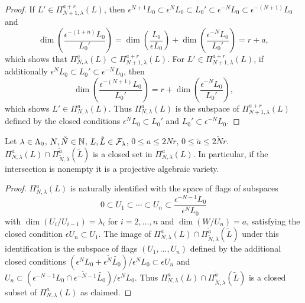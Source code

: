 \documentclass[a4paper, 11pt]{report}
\begin{document}
\begin{proof}
If $L'\in\Pi_{N+1,\lambda}^{a+r}(L)$, then $\epsilon^{N+1}L_0\subset \epsilon^N L_0\subset L_0'\subset\epsilon^{-N}L_0\subset\epsilon^{-(N+1)}L_0$ and
\begin{equation*}
\dim\left(\frac{\epsilon^{-(1+n)}L_0}{L_0'}\right) = \dim\left(\frac{L_0}{\epsilon L_0}\right) + \dim\left(\frac{\epsilon^{-N}L_0}{L_0'}\right) = r+a,
\end{equation*}
which shows that $\Pi_{N,\lambda}^a(L)\subset \Pi_{N+1,\lambda}^{a+r}(L)$. For $L'\in\Pi_{N+1,\lambda}^{a+r}(L)$, if additionally $\epsilon^N L_0\subset L_0'\subset\epsilon^{-N}L_0$, then
\begin{equation*}
\dim\left(\frac{\epsilon^{-(N+1)}L_0}{L_0'}\right) = r + \dim\left(\frac{\epsilon^{-N}L_0}{L_0'}\right),
\end{equation*}
which shows $L'\in\Pi_{N,\lambda}^a(L)$. Thus $\Pi_{N,\lambda}^a(L)$ is the subspace of $\Pi_{N+1,\lambda}^{a+r}(L)$ defined by the closed conditions $\epsilon^N L_0\subset L_0'$ and $L_0'\subset\epsilon^{-N}L_0$.
\end{proof}

\begin{lemma}
Let $\lambda\in{\Lambda_0}$, $N,\tilde{N}\in\mathbb{N}$, $L,\tilde{L}\in\mathcal{F}_\lambda$, $0\le a\le 2Nr$, $0\le\tilde{a}\le2\tilde{N}r$. $\Pi_{N,\lambda}^a(L)\cap \Pi_{\tilde{N},\lambda}^{\tilde{a}}(\tilde{L})$ is a closed set in $\Pi_{N,\lambda}^a(L)$. In particular, if the intersection is nonempty it is a projective algebraic variety.
\end{lemma}

\begin{proof}
$\Pi_{N,\lambda}^a(L)$ is naturally identified with the space of flags of subspaces
\begin{equation*}
0\subset U_1\subset \cdots\subset U_n\subset \frac{\epsilon^{-N-1}L_0}{\epsilon^N L_0}
\end{equation*}
with $\dim(U_i/{U_{i-1}})=\lambda_i$ for $i=2,\ldots,n$ and $\dim(W/{U_n})=a$, satisfying the closed condition $\epsilon U_n\subset U_1$. The image of $\Pi_{N,\lambda}^a(L)\cap \Pi_{\tilde{N},\lambda}^{\tilde{a}}(\tilde{L})$ under this identification is the subspace of flags $(U_1,\ldots,U_n)$ defined by the additional closed conditions ${(\epsilon^N L_0+\epsilon^{\tilde{N}}\tilde{L_0})}/{\epsilon^N L_0}\subset\epsilon U_n$ and $U_n\subset {(\epsilon^{-N-1}L_0\cap \epsilon^{-\tilde{N}-1}\tilde{L_0})}/{\epsilon^N L_0}$. Thus $\Pi_{N,\lambda}^a(L)\cap \Pi_{\tilde{N},\lambda}^{\tilde{a}}(\tilde{L})$ is a closed subset of $\Pi_{N,\lambda}^a(L)$ as claimed.
\end{proof}
\end{document}
